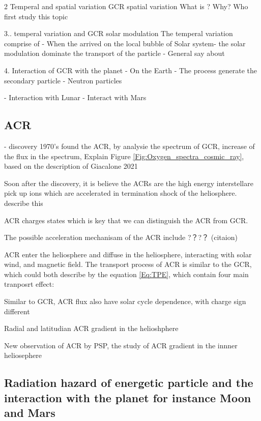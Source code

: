 \begin{figure}
	\centering
	
	
\end{figure}
	
2 Temperal and spatial variation
	GCR spatial variation
		What is ?
		Why?
		Who first study this topic 
	

3..  temperal variation and GCR solar modulation 
	 The temperal variation comprise of 
	- When the arrived on the local bubble of Solar system- the solar modulation dominate the transport of the particle - General say about 

4.  Interaction of GCR with the planet
	- On the Earth 
		- The process generate the secondary particle
		- Neutron particles	
		
		
	- Interaction with Lunar
	- Interact with Mars 

   


\subsection{ACR}
 - discovery 1970's found the ACR, by analysie the spectrum of GCR, increase of the flux in the spectrum, 
 Explain Figure \ref{Fig:Oxygen_spectra_cosmic_ray}, based on the description of Giacalone 2021

 Soon after the discovery, 
 it is believe the ACRs are the high energy interstellare pick up ions which are accelerated in termination shock of the heliosphere. 
 describe this 


 ACR charges states which is key that we can distinguish the ACR from GCR. 

 The possible acceleration mechanisam of the ACR include ?？?？ (citaion)

ACR enter the heliosphere and diffuse in the heliosphere, interacting with solar wind, and magnetic field. The transport process of ACR is similar to the GCR, which could both describe by the equation \ref{Eq:TPE}, which contain four main tranposrt effect: 

Similar to GCR, ACR flux also have solar cycle dependence, with charge sign different

Radial and latitudian ACR gradient in the helioshphere

New observation of ACR by PSP, the study of ACR gradient in the innner heliosephere


\subsection{Radiation hazard of energetic particle and the interaction with the planet for instance Moon and Mars}

